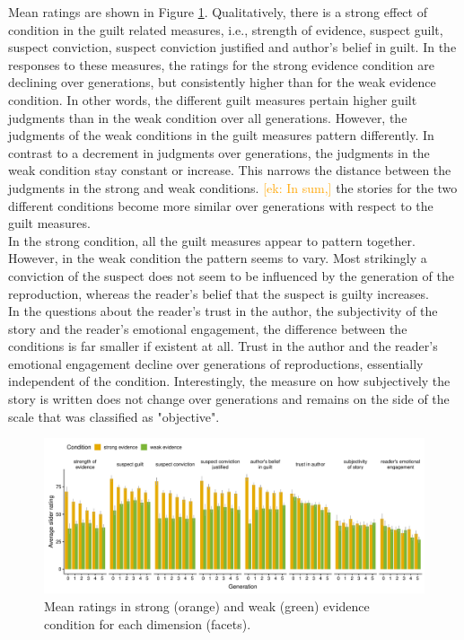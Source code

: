 \documentclass[10pt,letterpaper]{article}
\newcommand{\ek}[1]{\textcolor{Orange}{[ek: #1]}}
\begin{document}
Mean ratings are shown in Figure \ref{fig:exp2results}. Qualitatively, there is a strong effect of condition in the guilt related measures, i.e., strength of evidence, suspect guilt, suspect conviction, suspect conviction justified and author's belief in guilt. In the responses to these measures, the ratings for the strong evidence condition are declining over generations, but consistently higher than for the weak evidence condition. In other words, the different guilt measures pertain higher guilt judgments than in the weak condition over all generations. However, the judgments of the weak conditions in the guilt measures pattern differently. In contrast to a decrement in judgments over generations, the judgments in the weak condition stay constant or increase. This narrows the distance between the judgments in the strong and weak conditions. \ek{In sum,} the stories for the two different conditions become more similar over generations with respect to the guilt measures.\\
In the strong condition, all the guilt measures appear to pattern together. However, in the weak condition the pattern seems to vary. Most strikingly a conviction of the suspect does not seem to be influenced by the generation of the reproduction, whereas the reader's belief that the suspect is guilty increases.\\
In the questions about the reader's trust in the author, the subjectivity of the story and the reader's emotional engagement, the difference between the conditions is far smaller if existent at all. Trust in the author and the reader's emotional engagement decline over generations of reproductions, essentially independent of the condition. Interestingly, the measure on how subjectively the story is written does not change over generations and remains on the side of the scale that was classified as "objective".

\begin{figure}[]
	\includegraphics[width=\textwidth]{graphs/subj_results_byquestion.pdf}
	\caption{Mean ratings  in strong (orange) and weak (green) evidence condition for each dimension (facets).} 
	\label{fig:exp2results}
\end{figure}
\end{document}
